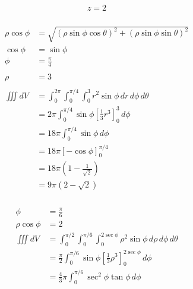 \documentclass{article}
\begin{document}
\[z = 2\]

\setcounter{subsubsection}{74}
\subsubsection{}

\begin{align*}
  \rho \cos \phi & = \sqrt{(\rho \sin \phi \cos \theta)^2 + (\rho \sin \phi \sin \theta)^2}        \\
  \cos \phi      & = \sin \phi                                                                     \\
  \phi           & = \frac{\pi}{4}                                                                 \\ \\
  \rho           & = 3                                                                             \\ \\
  \iiint dV      & = \int_0^{2 \pi} \int_0^{\pi / 4} \int_0^3 r^2 \sin \phi \,dr \,d\phi \,d\theta \\
                 & = 2 \pi \int_0^{\pi / 4} \sin \phi \left[ \frac{1}{3} r^3 \right]_0^3 \,d\phi   \\
                 & = 18 \pi \int_0^{\pi / 4} \sin \phi \,d\phi                                     \\
                 & = 18 \pi [-\cos \phi]_0^{\pi / 4}                                               \\
                 & = 18 \pi \left( 1 - \frac{1}{\sqrt{2}} \right)                                  \\
                 & = 9 \pi (2 - \sqrt{2})
\end{align*}

\setcounter{subsubsection}{76}
\subsubsection{}

\begin{align*}
  \phi           & = \frac{\pi}{6}                                                                                      \\
  \rho \cos \phi & = 2                                                                                                  \\
  \iiint dV      & = \int_0^{\pi / 2} \int_0^{\pi / 6} \int_0^{2 \sec \phi} \rho^2 \sin \phi \,d\rho \,d\phi \,d\theta  \\
                 & = \frac{\pi}{2} \int_0^{\pi / 6} \sin \phi \left[ \frac{1}{3} \rho^3 \right]_0^{2 \sec \phi} \,d\phi \\
                 & = \frac{4}{3} \pi \int_0^{\pi / 6} \sec^2 \phi \tan \phi \,d\phi
\end{align*}
\end{document}
